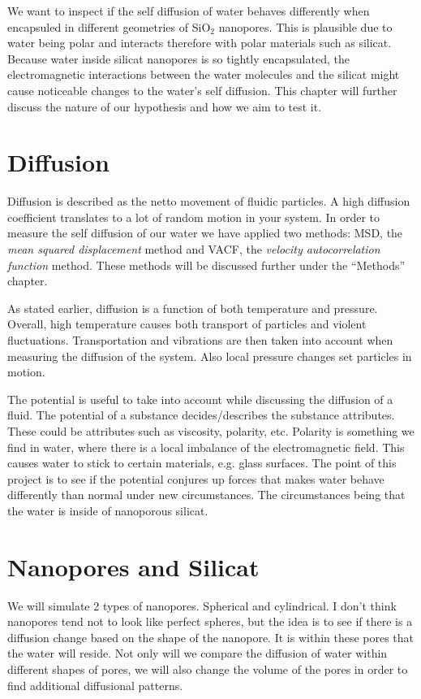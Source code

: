 \documentclass[10pt, a4paper]{report}
\begin{document}
We want to inspect if the self diffusion of water behaves differently
when encapsuled in different geometries of SiO$_2$ nanopores. This is plausible due to water being polar and interacts therefore with polar materials such as silicat. 
Because water inside silicat nanopores is so tightly encapsulated, the electromagnetic interactions between the water 
molecules and the silicat might cause noticeable changes to the water's self diffusion.
This chapter will further discuss the nature of our hypothesis and how we aim to test it.

\section{Diffusion}
Diffusion is described as the netto movement of fluidic particles. A high diffusion coefficient translates to a lot of random motion in your system.
In order to measure the self diffusion of our water we have applied two methods: MSD, the \emph{mean squared displacement} method and VACF, the \emph{velocity autocorrelation function} method.
These methods will be discussed further under the ``Methods'' chapter.

As stated earlier, diffusion is a function of both temperature and pressure. Overall, high temperature causes both transport of particles and violent fluctuations.
Transportation and vibrations are then taken into account when measuring the diffusion of the system. Also local pressure changes set particles in motion.

The potential is useful to take into account while discussing the diffusion of a fluid. The potential of a substance decides/describes the substance attributes. These could be attributes such as viscosity, polarity, etc.
Polarity is something we find in water, where there is a local imbalance of the electromagnetic field. This causes water to stick to certain materials, e.g. glass surfaces. The point of this project is to see if
the potential conjures up forces that makes water behave differently than normal under new circumstances. The circumstances being that the water is inside of nanoporous silicat.

\section{Nanopores and Silicat}
We will simulate 2 types of nanopores. Spherical and cylindrical. I don't think nanopores tend not to look like perfect spheres, 
but the idea is to see if there is a diffusion change based on the shape of the nanopore.
It is within these pores that the water will reside.
Not only will we compare the diffusion of water within different shapes of pores, we will also change the volume of the pores in order to find additional diffusional patterns.
\end{document}
